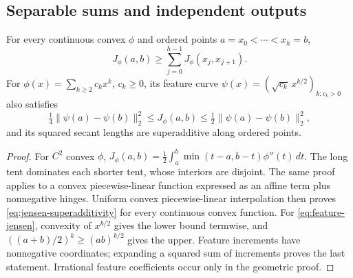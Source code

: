 \subsection{Separable sums and independent outputs}

\begin{lemma}\label{lem:jensen-superadditivity}
For every continuous convex $\phi$ and ordered points
$a=x_0<\cdots<x_h=b$,
\begin{equation}\label{eq:jensen-superadditivity}
 J_\phi(a,b)\ge\sum_{j=0}^{h-1}J_\phi(x_j,x_{j+1}).
\end{equation}
For $\phi(x)=\sum_{k\ge2}c_kx^k$, $c_k\ge0$, its feature curve
$\psi(x)=(\sqrt{c_k}\,x^{k/2})_{k:c_k>0}$ also satisfies
\begin{equation}\label{eq:feature-jensen}
 \tfrac14\|\psi(a)-\psi(b)\|_2^2\le J_\phi(a,b)
 \le\tfrac12\|\psi(a)-\psi(b)\|_2^2,
\end{equation}
and its squared secant lengths are superadditive along ordered points.
\end{lemma}
\begin{proof}
For $C^2$ convex $\phi$,
$J_\phi(a,b)=\frac12\int_a^b\min(t-a,b-t)\phi''(t)\,dt$.
The long tent dominates each shorter tent, whose interiors are disjoint.
The same proof applies to a convex piecewise-linear function expressed
as an affine term plus nonnegative hinges. Uniform convex piecewise-linear
interpolation then proves \eqref{eq:jensen-superadditivity} for every
continuous convex function. For \eqref{eq:feature-jensen}, convexity
of $x^{k/2}$ gives the lower bound termwise, and
$((a+b)/2)^k\ge(ab)^{k/2}$ gives the upper. Feature increments have
nonnegative coordinates; expanding a squared sum of increments proves
the last statement. Irrational feature coefficients occur only in the
geometric proof.
\end{proof}

